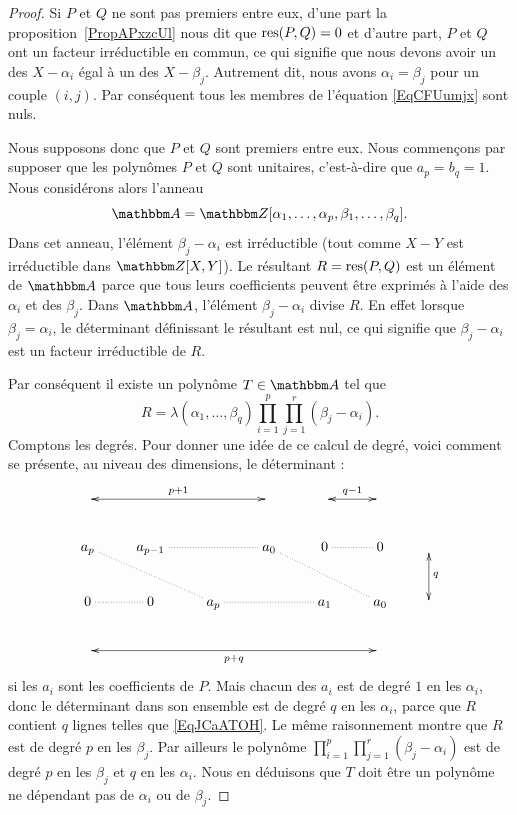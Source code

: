 \begin{proof}
    Si \( P\) et \( Q\) ne sont pas premiers entre eux, d'une part la proposition~\ref{PropAPxzcUl} nous dit que \( \operatorname{res}(P,Q)=0\) et d'autre part, \( P\) et \( Q\) ont un facteur irréductible en commun, ce qui  signifie que nous devons avoir un des \( X-\alpha_i\) égal à un des \( X-\beta_j\). Autrement dit, nous avons \( \alpha_i=\beta_j\) pour un couple \( (i,j)\). Par conséquent tous les membres de l'équation \eqref{EqCFUumjx} sont nuls.

    Nous supposons donc que \( P\) et \( Q\) sont premiers entre eux. Nous commençons par supposer que les polynômes \( P\) et \( Q\) sont unitaires, c'est-à-dire que \( a_p=b_q=1\). Nous considérons alors l'anneau
    \begin{equation}
        \eA=\eZ[\alpha_1,\ldots, \alpha_p,\beta_1,\ldots, \beta_q].
    \end{equation}
    Dans cet anneau, l'élément \( \beta_j-\alpha_i\) est irréductible (tout comme \( X-Y\) est irréductible dans \( \eZ[X,Y]\)). Le résultant \( R=\operatorname{res}(P,Q)\) est un élément de \( \eA\) parce que tous leurs coefficients peuvent être exprimés à l'aide des \( \alpha_i\) et des \( \beta_j\). Dans \( \eA\), l'élément \( \beta_j-\alpha_i\) divise \( R\). En effet lorsque \( \beta_j=\alpha_i\), le déterminant définissant le résultant est nul, ce qui signifie que \( \beta_j-\alpha_i\) est un facteur irréductible de \( R\).

    Par conséquent il existe un polynôme \( T\in \eA\) tel que
    \begin{equation}
        R=\lambda(\alpha_1,\ldots, \beta_q)\prod_{i=1}^p\prod_{j=1}^r(\beta_j-\alpha_i).
    \end{equation}
    Comptons les degrés. Pour donner une idée de ce calcul de degré, voici comment se présente, au niveau des dimensions, le déterminant :
    \begin{equation}  \label{EqJCaATOH}
    \xymatrix{%
        \ar@{<->}[rrr]^{p+1}&&&& \ar@{<->}[r]^{q-1}  &\\
        a_p\ar@{.}[rrd] &a_{p-1}\ar@{.}[rr]  &  & a_0\ar@{.}[rrd] & 0\ar@{.}[r]&0&\ar@{<->}[d]^q \\
        0\ar@{.}[r]&0&a_p\ar@{.}[rr]&&a_1&a_0&\\
        \ar@{<->}[rrrrr]_{p+q}&&&&&&
       }
    \end{equation}
    si les \( a_i\) sont les coefficients de \( P\). Mais chacun des \( a_i\) est de degré \( 1\) en les \( \alpha_i\), donc le déterminant dans son ensemble est de degré \( q\) en les \( \alpha_i\), parce que \( R\) contient \( q\) lignes telles que \eqref{EqJCaATOH}. Le même raisonnement montre que \( R\) est de degré \( p\) en les \( \beta_j\). Par ailleurs le polynôme \( \prod_{i=1}^p\prod_{j=1}^r(\beta_j-\alpha_i)\) est de degré \( p\) en les \( \beta_j\) et \( q\) en les \( \alpha_i\). Nous en déduisons que \( T\) doit être un polynôme ne dépendant pas de \( \alpha_i\) ou de \( \beta_j\).


\end{proof}
